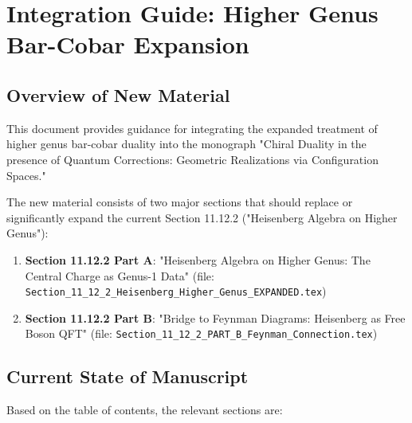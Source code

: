 \section{Integration Guide: Higher Genus Bar-Cobar Expansion}

\subsection{Overview of New Material}

This document provides guidance for integrating the expanded treatment of higher genus bar-cobar duality into the monograph "Chiral Duality in the presence of Quantum Corrections: Geometric Realizations via Configuration Spaces."

The new material consists of two major sections that should replace or significantly expand the current Section 11.12.2 ("Heisenberg Algebra on Higher Genus"):

\begin{enumerate}
\item \textbf{Section 11.12.2 Part A}: "Heisenberg Algebra on Higher Genus: The Central Charge as Genus-1 Data" (file: \texttt{Section\_11\_12\_2\_Heisenberg\_Higher\_Genus\_EXPANDED.tex})

\item \textbf{Section 11.12.2 Part B}: "Bridge to Feynman Diagrams: Heisenberg as Free Boson QFT" (file: \texttt{Section\_11\_12\_2\_PART\_B\_Feynman\_Connection.tex})
\end{enumerate}

\subsection{Current State of Manuscript}

Based on the table of contents, the relevant sections are:

